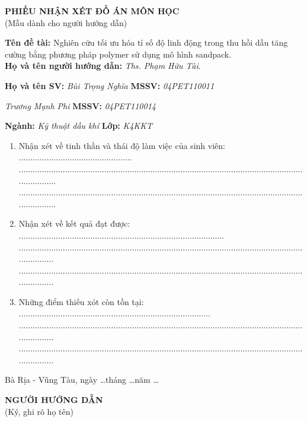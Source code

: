 \documentclass[12pt,a4paper]{article}
\begin{document}
\begin{center}
	\centering
	\textbf{PHIẾU NHẬN XÉT ĐỒ ÁN MÔN HỌC}\\
	(Mẫu dành cho người hướng dẫn)
\end{center}
\textbf{Tên đề tài:} Nghiên cứu tối ưu hóa tỉ số độ linh động trong thu hồi dầu tăng cường bằng phương pháp polymer sử dụng mô hình sandpack.\\
\textbf{Họ và tên người hướng dẫn:} \textit{Ths. Phạm Hữu Tài}.

\textbf{Họ và tên SV:} \textit{Bùi Trọng Nghĩa} \hspace{98pt} \textbf{MSSV:} \textit{04PET110011} 

\hspace{68pt} \textit{Trương Mạnh Phi} \hspace{95pt} \textbf{MSSV:} \textit{04PET110014}

\textbf{Ngành:} \textit{Kỹ thuật dầu khí} \hspace{130pt} \textbf{Lớp:} \textit{K4KKT}
\begin{enumerate}
	\item Nhận xét về tinh thần và thái độ làm việc của sinh viên: .................................................\\...........................................................................................................................................\\...........................................................................................................................................
	\item Nhận xét về kết quả đạt được: .........................................................................................\\..........................................................................................................................................\\..........................................................................................................................................
	\item Những điểm thiếu xót còn tồn tại: ...................................................................................\\..........................................................................................................................................\\..........................................................................................................................................
\end{enumerate}
\begin{flushright}
Bà Rịa - Vũng Tàu, ngày \ldots tháng \ldots năm \ldots \\
\end{flushright}
\hspace{300pt} \textbf{NGƯỜI HƯỚNG DẪN}\\
\hspace*{316pt} (Ký, ghi rõ họ tên)
\end{document}
